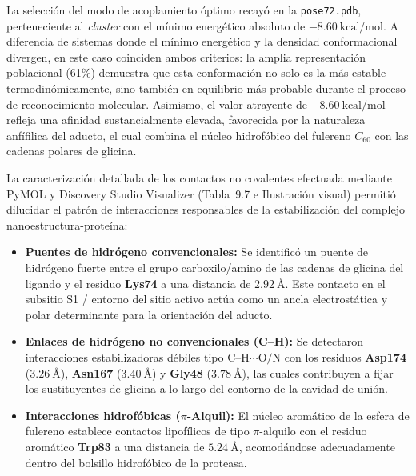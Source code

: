 La selección del modo de acoplamiento óptimo recayó en la \texttt{pose72.pdb}, perteneciente al \textit{cluster} con el mínimo energético absoluto de $-8.60\ \text{kcal/mol}$. A diferencia de sistemas donde el mínimo energético y la densidad conformacional divergen, en este caso coinciden ambos criterios: la amplia representación poblacional (61\%) demuestra que esta conformación no solo es la más estable termodinómicamente, sino también  en equilibrio más probable durante el proceso de reconocimiento molecular. Asimismo, el valor atrayente de $-8.60\ \text{kcal/mol}$ refleja una afinidad sustancialmente elevada, favorecida por la naturaleza anfífilica del aducto, el cual combina el núcleo hidrofóbico del fulereno $C_{60}$ con las cadenas polares de glicina.

La caracterización detallada de los contactos no covalentes efectuada mediante PyMOL y Discovery Studio Visualizer (Tabla~9.7 e Ilustración visual) permitió dilucidar el patrón de interacciones responsables de la estabilización del complejo nanoestructura-proteína:

\begin{itemize}
    \item \textbf{Puentes de hidrógeno convencionales:} Se identificó un puente de hidrógeno fuerte entre el grupo carboxilo/amino de las cadenas de glicina del ligando y el residuo \textbf{Lys74} a una distancia de $2.92\ \text{\AA}$. Este contacto en el subsitio S1 / entorno del sitio activo actúa como un ancla electrostática y polar determinante para la orientación del aducto.
    \item \textbf{Enlaces de hidrógeno no convencionales (C--H):} Se detectaron interacciones estabilizadoras débiles tipo $\text{C--H}\cdots\text{O/N}$ con los residuos \textbf{Asp174} ($3.26\ \text{\AA}$), \textbf{Asn167} ($3.40\ \text{\AA}$) y \textbf{Gly48} ($3.78\ \text{\AA}$), las cuales contribuyen a fijar los sustituyentes de glicina a lo largo del contorno de la cavidad de unión.
    \item \textbf{Interacciones hidrofóbicas ($\pi$-Alquil):} El núcleo aromático de la esfera de fulereno establece contactos lipofílicos de tipo $\pi$-alquilo con el residuo aromático \textbf{Trp83} a una distancia de $5.24\ \text{\AA}$, acomodándose adecuadamente dentro del bolsillo hidrofóbico de la proteasa.
\end{itemize}


